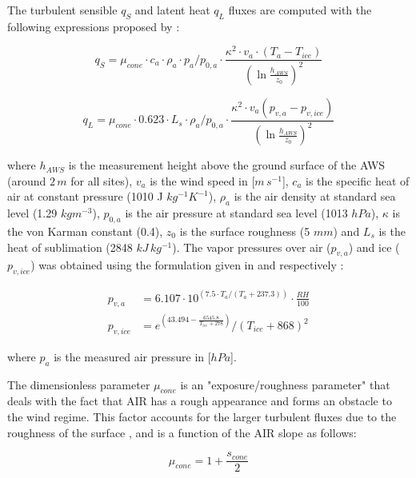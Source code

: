 \documentclass[utf8]{frontiersSCNS} %
\begin{document}
The turbulent sensible $q_{S}$ and latent heat $q_{L}$ fluxes are computed with the following expressions proposed by
\cite{Garratt_1992}:

\begin{equation} q_{S}=\mu_{cone}\cdot c_{a} \cdot \rho_{a} \cdot p_{a}/p_{0,a} \cdot \frac{\kappa^2 \cdot v_a \cdot
		(T_a-T_{ice})}{{(\ln{\frac{h_{AWS}}{z_{0}}})}^2} \label{eqn:qs} \end{equation}

\begin{equation} q_{L}=\mu_{cone}\cdot 0.623 \cdot L_s \cdot \rho_{a}/p_{0,a} \cdot \frac{\kappa^2 \cdot
	v_a(p_{v,a}-p_{v,ice})}{{(\ln{\frac{h_{AWS}}{z_{0}}})}^2} \end{equation}

where $h_{AWS}$ is the measurement height above the ground surface of the AWS (around $2\,m$ for all sites), $v_a$ is
the wind speed in [$m\,s^{-1}$], $c_a$ is the specific heat of air at constant pressure (1010 J $kg^{-1} K^{-1}$),
$\rho_{a}$ is the air density at standard sea level (1.29 $kg m^{-3}$), $p_{0,a}$ is the air pressure at standard sea
level (1013 $hPa$), $\kappa$ is the von Karman constant (0.4), $z_{0}$ is the surface roughness (5 $mm$) and $L_s$
is the heat of sublimation (2848 $kJ\,kg^{-1}$).  The vapor pressures over air ($p_{v,a}$) and ice ($p_{v,ice}$)
was obtained using the formulation given in \cite{WMO_2018} and \cite{huang_2018} respectively  :

\begin{equation}
	\begin{split}
		p_{v,a}&=6.107 \cdot 10^{(7.5 \cdot T_a / (T_a + 237.3))} \cdot \frac{RH}{100}\\
		p_{v,ice}&=e^{(43.494 - \frac{6545.8}{T_{ice} + 278})}/(T_{ice} + 868)^2
	\end{split} \label{eqn:vp}
\end{equation}

where $p_{a}$ is the measured air pressure in [$hPa$].

The dimensionless parameter $\mu_{cone}$ is an "exposure/roughness parameter" that deals with the fact that AIR has a
rough appearance and forms an obstacle to the wind regime. This factor accounts for the larger turbulent fluxes due to
the roughness of the surface \citep{Oerlemans_2021}, and is a function of the AIR slope as follows:

\begin{equation}
	\mu_{cone} = 1 + \frac{s_{cone}}{2}
\end{equation}
\end{document}

